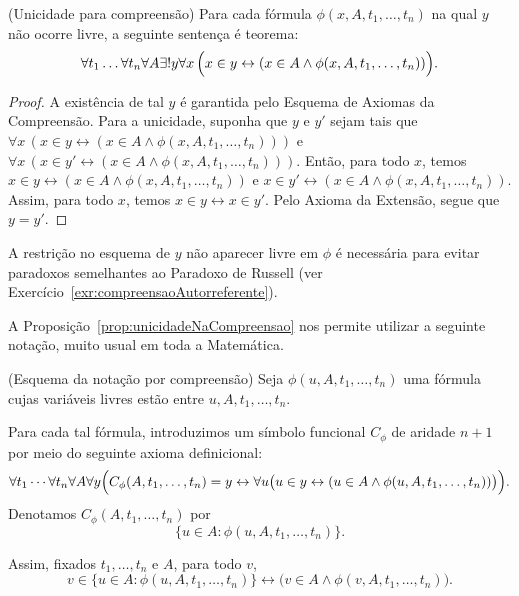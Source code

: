 \begin{proposition}[$\BST$](Unicidade para compreensão)\label{prop:unicidadeNaCompreensao}
    Para cada fórmula $\phi(x, A, t_1, \ldots, t_n)$ na qual $y$ não ocorre livre, a seguinte sentença é teorema:
    \begin{equation}
         \forall t_1 \ldots \forall t_n \forall A\exists! y \forall x\,
        \Bigl(x \in y \leftrightarrow (x \in A \land \phi(x, A, t_1, \ldots, t_n))\Bigr).
    \end{equation}
\end{proposition}
\begin{proof}
    A existência de tal $y$ é garantida pelo Esquema de Axiomas da Compreensão.
    Para a unicidade, suponha que $y$ e $y'$ sejam tais que $\forall x\, (x \in y \leftrightarrow (x \in A \land \phi(x, A, t_1, \ldots, t_n)))$ e $\forall x\, (x \in y' \leftrightarrow (x \in A \land \phi(x, A, t_1, \ldots, t_n)))$.
    Então, para todo $x$, temos $x \in y \leftrightarrow (x \in A \land \phi(x, A, t_1, \ldots, t_n))$ e $x \in y' \leftrightarrow (x \in A \land \phi(x, A, t_1, \ldots, t_n))$.
    Assim, para todo $x$, temos $x \in y \leftrightarrow x \in y'$.
    Pelo Axioma da Extensão, segue que $y = y'$.
\end{proof}

A restrição no esquema de $y$ não aparecer livre em $\phi$ é necessária para evitar paradoxos semelhantes ao Paradoxo de Russell (ver Exercício~\ref{exr:compreensaoAutorreferente}).

A Proposição~\ref{prop:unicidadeNaCompreensao} nos permite utilizar a seguinte notação, muito usual em toda a Matemática.

\begin{definition}[$\BST$](Esquema da notação por compreensão)\label{def:notacaoPorCompreensao}
Seja $\phi(u,A,t_1,\ldots,t_n)$ uma fórmula cujas variáveis livres estão entre
$u,A,t_1,\ldots,t_n$.

Para cada tal fórmula, introduzimos um símbolo funcional $C_\phi$ de aridade $n+1$
por meio do seguinte axioma definicional:
\[
\forall t_1\cdots\forall t_n\forall A\forall y
\Bigl(
C_\phi(A,t_1,\ldots,t_n)=y
\leftrightarrow
\forall u\bigl(u\in y\leftrightarrow
(u\in A\land \phi(u,A,t_1,\ldots,t_n))\bigr)
\Bigr).
\]
Denotamos $C_\phi(A,t_1,\ldots,t_n)$ por
\[
\{u\in A:\phi(u,A,t_1,\ldots,t_n)\}.
\]

Assim, fixados $t_1, \dots, t_n$ e $A$, para todo $v$,
\[
v\in \{u\in A:\phi(u,A,t_1,\ldots,t_n)\}
\leftrightarrow
\bigl(v\in A\land \phi(v,A,t_1,\ldots,t_n)\bigr).
\]
\end{definition}

